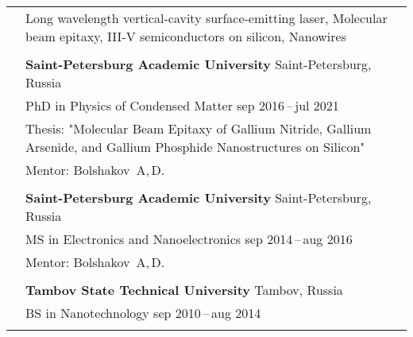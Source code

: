 \documentclass[letterpaper, 11pt]{article}
\begin{document}
	\begin{longtable}{p{1.3in}p{4.8in}}
		
		
		\nohyphens{\color{OliveGreen}{Research interests}}
        & Long wavelength vertical-cavity surface-emitting laser, Molecular
        beam epitaxy, III-V semiconductors on silicon, Nanowires \\
		& \\
		
		
		\color{OliveGreen}{Education}
		& \textbf{Saint-Petersburg Academic University} \hfill Saint-Petersburg, Russia \\
		& PhD in Physics of Condensed Matter \hfill sep 2016\,--\,jul 2021 \\
        & Thesis: "Molecular Beam Epitaxy of Gallium Nitride, Gallium Arsenide,
        and Gallium Phosphide Nanostructures on Silicon" \\
		& Mentor: Bolshakov~A,\,D.\\
		& \\
		
		& \textbf{Saint-Petersburg Academic University} \hfill Saint-Petersburg, Russia \\
		& MS in Electronics and Nanoelectronics \hfill sep 2014\,--\,aug 2016\\
		& Mentor: Bolshakov~A,\,D. \\
		& \\
		
		& \textbf{Tambov State Technical University} \hfill Tambov, Russia\\
		& BS in Nanotechnology \hfill sep 2010\,--\,aug 2014\\
		& \\
		
		
		

\end{longtable}
\end{document}

